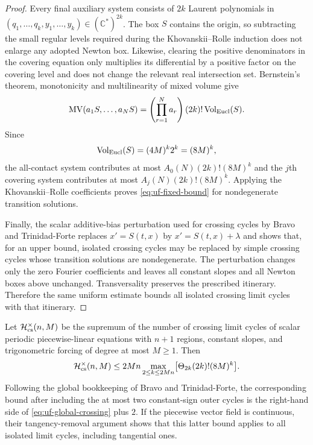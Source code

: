 \begin{proof}
Every final auxiliary system consists of $2k$ Laurent polynomials in
$(q_1,\ldots,q_k,y_1,\ldots,y_k)\in(\mathbb C^*)^{2k}$.  The box $S$ contains
the origin, so subtracting the small regular levels required during the
Khovanskii--Rolle induction does not enlarge any adopted Newton box.  Likewise,
clearing the positive denominators in the covering equation only multiplies its
differential by a positive factor on the covering level and does not change the
relevant real intersection set.  Bernstein's theorem, monotonicity and
multilinearity of mixed volume give
\[
 \operatorname{MV}(a_1S,\ldots,a_NS)
 =\left(\prod_{r=1}^Na_r\right)(2k)!\operatorname{Vol}_{\rm Eucl}(S).
\]
Since
\[
 \operatorname{Vol}_{\rm Eucl}(S)=(4M)^k2^k=(8M)^k,
\]
the all-contact system contributes at most
$A_0(N)(2k)!(8M)^k$ and the $j$th covering system contributes at most
$A_j(N)(2k)!(8M)^k$.  Applying the Khovanskii--Rolle coefficients proves
\eqref{eq:uf-fixed-bound} for nondegenerate transition solutions.

Finally, the scalar additive-bias perturbation used for crossing cycles by
Bravo and Trinidad-Forte replaces $x'=S(t,x)$ by $x'=S(t,x)+\lambda$ and
shows that, for an upper bound, isolated crossing cycles may be replaced by
simple crossing cycles whose transition solutions are nondegenerate.  The
perturbation changes only the zero Fourier coefficients and leaves all constant
slopes and all Newton boxes above unchanged.  Transversality preserves the
prescribed itinerary.  Therefore the same uniform estimate bounds all isolated
crossing limit cycles with that itinerary.
\end{proof}

\begin{corollary}
\label{cor:uf-global}
Let $\mathcal H_{\rm cs}^{\times}(n,M)$ be the supremum of the number of
crossing limit cycles of scalar periodic piecewise-linear equations with $n+1$
regions, constant slopes, and trigonometric forcing of degree at most $M\ge1$.
Then
\begin{equation}\label{eq:uf-global-crossing}
 \mathcal H_{\rm cs}^{\times}(n,M)
 \le 2Mn
 \max_{2\le k\le2Mn}
 \bigl[\Theta_{2k}(2k)!(8M)^k\bigr].
\end{equation}
Following the global bookkeeping of Bravo and Trinidad-Forte, the corresponding
bound after including the at most two constant-sign outer cycles is the
right-hand side of \eqref{eq:uf-global-crossing} plus $2$.  If the piecewise
vector field is continuous, their tangency-removal argument shows that this
latter bound applies to all isolated limit cycles, including tangential ones.
\end{corollary}

